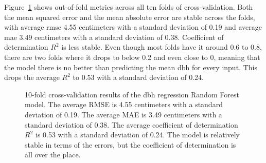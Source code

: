 Figure~\ref{fig-cv-reg} shows out-of-fold metrics across all ten folds of cross-validation.
Both the mean squared error and the mean absolute error are stable across the folds, with average \gls{rmse} 4.55 centimeters with a standard deviation of 0.19 and average \gls{mae} 3.49 centimeters with a standard deviation of 0.38.
Coefficient of determination $R^2$ is less stable.
Even though most folds have it around 0.6 to 0.8, there are two folds where it drops to below 0.2 and even close to 0, meaning that the model there is no better than predicting the mean \gls{dbh} for every input.
This drops the average $R^2$ to 0.53 with a standard deviation of 0.24.

\begin{figure}
\caption[Cross-validation results of the dbh regression Random Forest model.]{\label{fig-cv-reg}10-fold cross-validation results of the dbh
regression Random Forest model. The average RMSE is 4.55 centimeters
with a standard deviation of 0.19. The average MAE is 3.49 centimeters
with a standard deviation of 0.38. The average coefficient of
determination \(R^2\) is 0.53 with a standard deviation of 0.24. The
model is relatively stable in terms of the errors, but the coefficient
of determination is all over the place.}
\end{figure}

